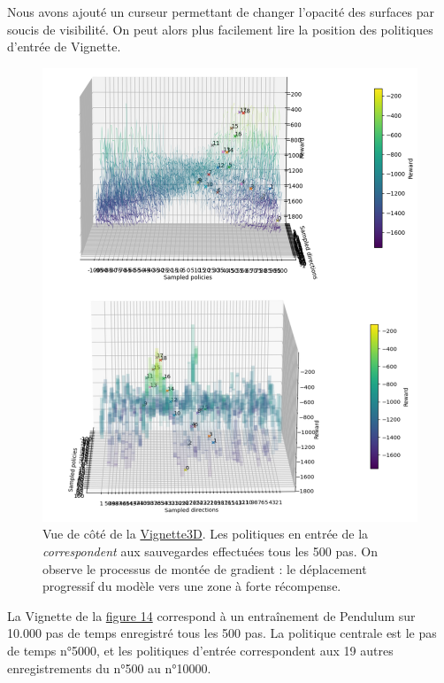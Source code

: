 \documentclass[12pt]{article}
\begin{document}
\newpage
Nous avons ajouté un curseur permettant de changer l'opacité des surfaces par soucis de visibilité. On peut alors plus facilement lire la position des politiques d'entrée de Vignette. \\

\begin{figure}[htp]
    \centering
    \includegraphics[width=15cm]{Images/vignette_cote}
    \caption{Vue de côté de la \hyperref[fig:vignette3D]{Vignette3D}. Les politiques en entrée de la \emph{correspondent} aux sauvegardes effectuées tous les 500 pas. On observe le processus de montée de gradient : le déplacement progressif du modèle vers une zone à forte récompense.}
    \label{fig:vignetteCote}
\end{figure}

La Vignette de la \hyperref[fig:vignetteCote]{figure 14} correspond à un entraînement de Pendulum sur 10.000 pas de temps enregistré tous les 500 pas. La politique centrale est le pas de temps n°5000, et les politiques d'entrée correspondent aux 19 autres enregistrements du n°500 au n°10000. \\
\end{document}
